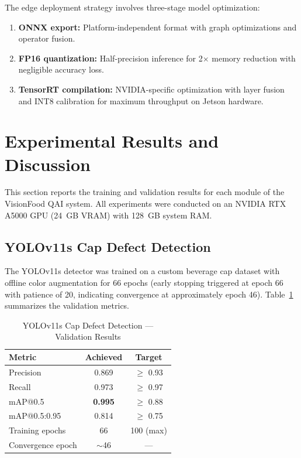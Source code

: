 \documentclass{ieeeaccess}
\begin{document}
The edge deployment strategy involves three-stage model optimization:
\begin{enumerate}
    \item \textbf{ONNX export:} Platform-independent format with graph optimizations and operator fusion.
    \item \textbf{FP16 quantization:} Half-precision inference for 2$\times$ memory reduction with negligible accuracy loss.
    \item \textbf{TensorRT compilation:} NVIDIA-specific optimization with layer fusion and INT8 calibration for maximum throughput on Jetson hardware.
\end{enumerate}


\section{Experimental Results and Discussion}
\label{sec:results}

This section reports the training and validation results for each module of the VisionFood QAI system. All experiments were conducted on an NVIDIA RTX A5000 GPU (24~GB VRAM) with 128~GB system RAM.

\subsection{YOLOv11s Cap Defect Detection}

The YOLOv11s detector was trained on a custom beverage cap dataset with offline color augmentation for 66 epochs (early stopping triggered at epoch 66 with patience of 20, indicating convergence at approximately epoch 46). Table~\ref{tab:yolov11_results} summarizes the validation metrics.

\begin{table}[!t]
\caption{YOLOv11s Cap Defect Detection --- Validation Results}
\label{tab:yolov11_results}
\centering
\small
\begin{tabular}{lcc}
\toprule
\textbf{Metric} & \textbf{Achieved} & \textbf{Target} \\
\midrule
Precision & 0.869 & $\geq$ 0.93 \\
Recall & 0.973 & $\geq$ 0.97 \\
mAP@0.5 & \textbf{0.995} & $\geq$ 0.88 \\
mAP@0.5:0.95 & 0.814 & $\geq$ 0.75 \\
\midrule
Training epochs & 66 & 100 (max) \\
Convergence epoch & $\sim$46 & --- \\
\bottomrule
\end{tabular}
\end{table}
\end{document}
